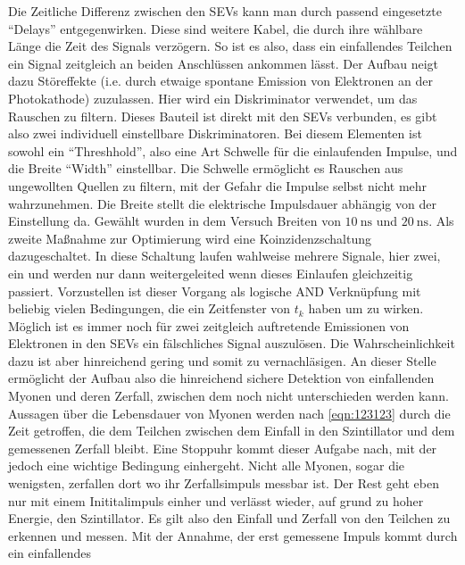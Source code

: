 \vspace{0.5cm}
Die Zeitliche Differenz zwischen den SEVs kann man durch passend eingesetzte \enquote{Delays} entgegenwirken. Diese sind weitere Kabel, 
die durch ihre wählbare Länge die Zeit des Signals verzögern. So ist es also, dass ein einfallendes Teilchen ein Signal zeitgleich an beiden Anschlüssen ankommen lässt.
Der Aufbau neigt dazu Störeffekte (i.e. durch etwaige spontane Emission von Elektronen an der Photokathode) zuzulassen. Hier wird ein Diskriminator verwendet, um das Rauschen zu filtern.
Dieses Bauteil ist direkt mit den SEVs verbunden, es gibt also zwei individuell einstellbare Diskriminatoren.
Bei diesem Elementen ist sowohl ein \enquote{Threshhold}, also eine Art Schwelle für die einlaufenden Impulse, und die Breite \enquote{Width} einstellbar.
Die Schwelle ermöglicht es Rauschen aus ungewollten Quellen zu filtern, mit der Gefahr die Impulse selbst nicht mehr wahrzunehmen. 
Die Breite stellt die elektrische Impulsdauer abhängig von der Einstellung da. Gewählt wurden in dem Versuch Breiten von $\SI{10}{\nano\second}$ und $\SI{20}{\nano\second}$.
Als zweite Maßnahme zur Optimierung wird eine Koinzidenzschaltung dazugeschaltet. 
In diese Schaltung laufen wahlweise mehrere Signale, hier zwei, ein und werden nur dann weitergeleited wenn dieses Einlaufen gleichzeitig passiert.
Vorzustellen ist dieser Vorgang als logische AND Verknüpfung mit beliebig vielen Bedingungen, die ein Zeitfenster von $t_k$ haben um zu wirken. 
\\
\newline
Möglich ist es immer noch für zwei zeitgleich auftretende Emissionen von Elektronen in den SEVs ein fälschliches Signal auszulösen. Die Wahrscheinlichkeit dazu ist aber hinreichend gering
und somit zu vernachläsigen. An dieser Stelle ermöglicht der Aufbau also die hinreichend sichere Detektion von einfallenden Myonen und deren Zerfall, 
zwischen dem noch nicht unterschieden werden kann. 
\\
\newline
Aussagen über die Lebensdauer von Myonen werden nach \eqref{eqn:123123} durch die Zeit getroffen, die dem Teilchen zwischen dem Einfall in den Szintillator und dem gemessenen 
Zerfall bleibt. Eine Stoppuhr kommt dieser Aufgabe nach, mit der jedoch eine wichtige Bedingung einhergeht. 
Nicht alle Myonen, sogar die wenigsten, zerfallen dort wo ihr Zerfallsimpuls messbar ist. Der Rest geht eben nur mit einem Inititalimpuls einher und verlässt wieder, auf grund zu hoher Energie, den Szintillator.
Es gilt also den Einfall und Zerfall von den Teilchen zu erkennen und messen. Mit der Annahme, der erst gemessene Impuls kommt durch ein einfallendes 
